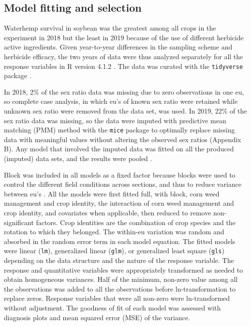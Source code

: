 \documentclass[
]{article}
\begin{document}
\hypertarget{model-fitting-and-selection}{%
\subsection*{Model fitting and selection}\label{model-fitting-and-selection}}

Waterhemp survival in soybean was the greatest among all crops in the experiment in 2018 but the least in 2019 because of the use of different herbicide active ingredients. Given year-to-year differences in the sampling scheme and herbicide efficacy, the two years of data were thus analyzed separately for all the response variables in R version 4.1.2 \citep{rdevelopmentcoreteamLanguageEnvironmentStatistical2021}. The data was curated with the \texttt{tidyverse} package \citep[version 1.3.1,][]{wickhamTidyverseEasilyInstall2021}.

In 2018, 2\% of the sex ratio data was missing due to zero observations in one eu, so complete case analysis, in which eu's of known sex ratio were retained while unknown sex ratio were removed from the data set, was used. In 2019, 22\% of the sex ratio data was missing, so the data were imputed with predictive mean matching (PMM) method with the \texttt{mice} package \citep[version 3.13.0,][]{vanbuurenMiceMultivariateImputation2011} to optimally replace missing data with meaningful values without altering the observed sex ratios (Appendix B). Any model that involved the imputed data was fitted on all the produced (imputed) data sets, and the results were pooled \citep{whiteMultipleImputationUsing2011}.

Block was included in all models as a fixed factor because blocks were used to control the different field conditions across sections, and thus to reduce variance between eu's \citep{dixonShouldBlocksBe2016}. All the models were first fitted full, with block, corn weed management and crop identity, the interaction of corn weed management and crop identity, and covariates when applicable, then reduced to remove non-significant factors. Crop identities are the combination of crop species and the rotation to which they belonged. The within-eu variation was random and absorbed in the random error term in each model equation. The fitted models were linear (\texttt{lm}), generalized linear (\texttt{glm}), or generalized least square (\texttt{gls}) depending on the data structure and the nature of the response variable. The response and quantitative variables were appropriately transformed as needed to obtain homogeneous variances. Half of the minimum, non-zero value among all the observations was added to all the observations before ln-transformation to replace zeros. Response variables that were all non-zero were ln-transformed without adjustment. The goodness of fit of each model was assessed with diagnosis plots and mean squared error (MSE) of the variance.
\end{document}
